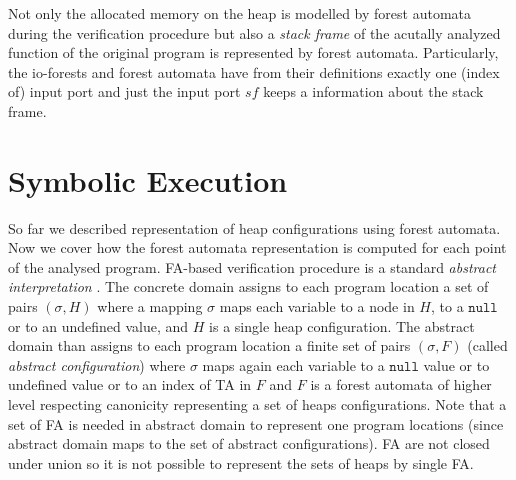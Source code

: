 Not only the allocated memory on the heap is modelled by forest automata during the verification procedure but also
a \emph{stack frame} of the acutally analyzed function of the original program is represented by forest automata.
Particularly, the io-forests and forest automata have from their definitions exactly one (index of) input port and
just the input port $sf$ keeps a information about the stack frame.

\section{Symbolic Execution}
\label{sec:se}

So far we described representation of heap configurations using forest automata.
Now we cover how the forest automata representation is computed for each point of the analysed program.
FA-based verification procedure is a standard \emph{abstract interpretation} \cite{cousot:77}.
The concrete domain assigns to each program location a set of pairs
$(\sigma,H)$ where a mapping $\sigma$ maps each variable
to a node in $H$, to a $\texttt{null}$ or to an undefined value, and $H$ is a single heap configuration.
The abstract domain than assigns to each program location a finite set of pairs
$(\sigma, F)$ (called \emph{abstract configuration}) where $\sigma$ maps again each variable to a
$\texttt{null}$ value or to undefined value or to an index of TA in $F$ and $F$ is a forest automata
of higher level respecting canonicity representing a set of heaps configurations.
Note that a set of FA is needed in abstract domain to represent one program locations (since
abstract domain maps to the set of abstract configurations).
FA are not closed under union so it is not possible to represent the sets of heaps by single FA.


